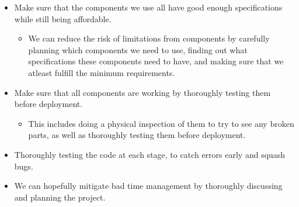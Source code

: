 \documentclass[11pt]{article}
\begin{document}
\begin{itemize}
    \item Make sure that the components we use all have good enough specifications while still being affordable. \begin{itemize}
        \item We can reduce the risk of limitations from components by carefully planning which components we need to use, finding out what specifications these components need to have, and making sure that we atleast fulfill the minimum requirements. 
    \end{itemize}
    \item Make sure that all components are working by thoroughly testing them before deployment. \begin{itemize}
        \item This includes doing a physical inspection of them to try to see any broken parts, as well as thoroughly testing them before deployment. 
    \end{itemize}
    \item Thoroughly testing the code at each stage, to catch errors early and squash bugs. 
    \item We can hopefully mitigate bad time management by thoroughly discussing and planning the project.  
\end{itemize}
\end{document}
